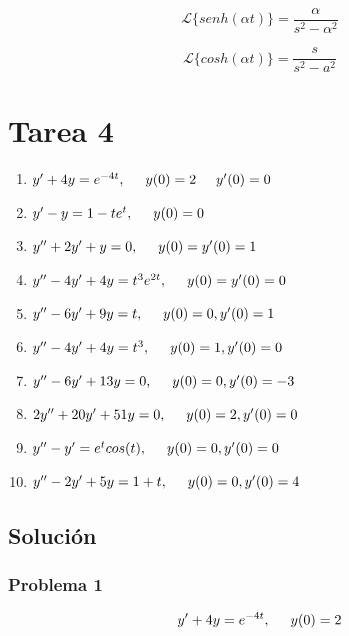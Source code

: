 \documentclass{article}
\begin{document}
\[
    \mathcal{L}\{senh(\alpha t)\} = \frac{\alpha}{s^2 - \alpha^2}
\]

\[
    \mathcal{L}\{cosh(\alpha t)\} = \frac{s}{s^2 - a^2}
\]


\section{Tarea 4}

\begin{enumerate}
    \item $y' + 4y = e^{-4t}, \hspace{.5cm} y(0) = 2 \hspace{.5cm} y'(0)=0$
    \item $y' - y = 1 - te^{t}, \hspace{.5cm} y(0) = 0$
    \item $y'' + 2y' + y = 0, \hspace{.5cm} y(0) = y'(0) = 1$
    \item $y'' - 4y' + 4y = t^{3}e^{2t}, \hspace{.5cm} y(0) = y'(0) = 0 $
    \item $y'' - 6y' + 9y = t, \hspace{.5cm} y(0) = 0, y'(0) = 1$
    \item $y'' - 4y' + 4y = t^3, \hspace{.5cm} y(0) = 1, y'(0) = 0 $
    \item $y'' - 6y' + 13y = 0, \hspace{.5cm} y(0) = 0, y'(0) = -3$
    \item $2y'' + 20y' + 51y = 0, \hspace{.5cm} y(0) = 2, y'(0) = 0$
    \item $y'' - y' = e^{t}cos(t), \hspace{.5cm} y(0) = 0, y'(0) = 0 $
    \item $y'' - 2y' + 5y = 1 + t, \hspace{.5cm} y(0) = 0, y'(0) = 4$
\end{enumerate}

\newpage

\subsection{Solución}

\subsubsection{Problema 1}
\[y' + 4y = e^{-4t}, \hspace{.5cm} y(0) = 2\]
\end{document}
